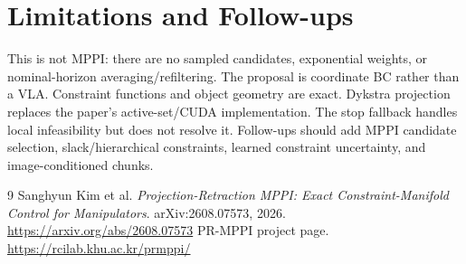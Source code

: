 \documentclass[11pt]{article}
\begin{document}
\section{Limitations and Follow-ups}
This is not MPPI: there are no sampled candidates, exponential weights, or nominal-horizon averaging/refiltering. The proposal is coordinate BC rather than a VLA. Constraint functions and object geometry are exact. Dykstra projection replaces the paper's active-set/CUDA implementation. The stop fallback handles local infeasibility but does not resolve it. Follow-ups should add MPPI candidate selection, slack/hierarchical constraints, learned constraint uncertainty, and image-conditioned chunks.

\begin{thebibliography}{9}
 Sanghyun Kim et al. \emph{Projection-Retraction MPPI: Exact Constraint-Manifold Control for Manipulators}. arXiv:2608.07573, 2026. \url{https://arxiv.org/abs/2608.07573}
 PR-MPPI project page. \url{https://rcilab.khu.ac.kr/prmppi/}
\end{thebibliography}
\end{document}
